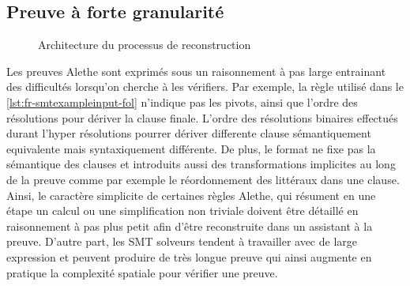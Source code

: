 \subsection*{Preuve à forte granularité}
\label{ssec:fr-preuve-coarse-grained}


\begin{figure}[tb]
\caption{Architecture du processus de reconstruction}
\label{fig:fr-bench-pipeline}
\end{figure}

Les preuves Alethe sont exprimés sous un raisonnement à pas large entrainant des difficultés lorsqu'on cherche à les vérifiers.
Par exemple, la règle  utilisé dans le \cref{lst:fr-smtexampleinput-fol} n'indique pas les pivots, ainsi que l'ordre des résolutions pour dériver la clause finale.
L'ordre des résolutions binaires effectués durant l'hyper résolutions pourrer dériver differente clause sémantiquement equivalente mais syntaxiquement différente.
De plus, le format ne fixe pas la sémantique des clauses et introduits aussi des transformations implicites au long de la preuve comme par exemple le réordonnement des littéraux dans une clause.
Ainsi, le caractère simplicite de certaines règles Alethe, qui résument en une étape un calcul ou une simplification non triviale doivent être détaillé en raisonnement à pas plus petit afin d'être reconstruite dans un assistant à la preuve.
D'autre part, les SMT solveurs tendent à travailler avec de large expression et peuvent produire de très longue preuve qui ainsi augmente en pratique la complexité spatiale pour vérifier une preuve. 


